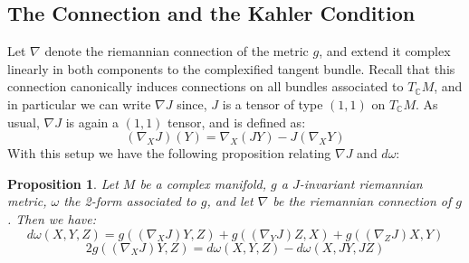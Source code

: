 \documentclass[11pt]{amsart}
\newtheorem{prop}[subsection]{Proposition}
\theoremstyle{definition}
\def \C{ \mathbb{C} }
\begin{document}
\subsection{ The Connection and the Kahler Condition}

Let $\nabla$ denote the riemannian connection of the metric $g$, and extend it complex linearly in both components to the complexified tangent bundle.  Recall that this connection canonically induces connections on all bundles associated to $T_{\C}M$, and in particular we can write $\nabla J$ since, $J$ is a tensor of type $(1,1)$ on $T_{\C}M$.  As usual, $\nabla J$ is again a $(1,1)$ tensor, and is defined as:
%
$$ ( \nabla_X J )(Y) = \nabla_X( JY ) - J( \nabla_X Y ) $$
%
With this setup we have the following proposition relating $\nabla J$ and $d \omega$:
%
\begin{prop} Let $M$ be a complex manifold, $g$ a $J$-invariant riemannian metric, $\omega$ the 2-form associated to $g$, and let $\nabla$ be the riemannian connection of $g$.  Then we have:
%
$$ d \omega( X, Y, Z ) = g( (\nabla_X J)Y, Z) + g( (\nabla_Y J)Z, X ) + g( (\nabla_Z J)X, Y ) $$
$$ 2 g( (\nabla_X J)Y, Z ) = d \omega(X, Y, Z) - d \omega(X, JY, JZ) $$
%
\end{prop}
%
\end{document}
